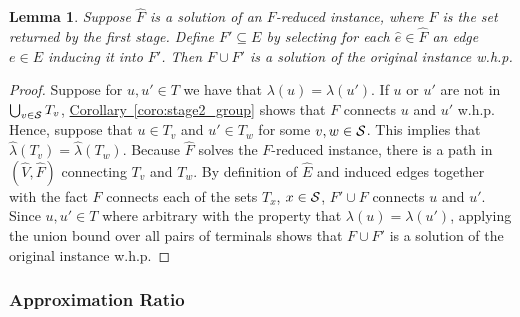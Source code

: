 \documentclass[letterpaper,11pt]{article}
\newtheorem{lemma}[theorem]{Lemma}
\newcommand{\namedref}[2]{\hyperref[#2]{#1~\ref*{#2}}}
\newcommand{\corollaryref}[1]{\namedref{Corollary}{#1}}
\newcommand{\Comp}{\lambda}
\begin{document}
\begin{lemma}\label{lemma:stage2_feasible}
Suppose $\hat{F}$ is a solution of an $F$-reduced instance, where $F$ is the set
returned by the first stage. Define $F'\subseteq E$ by selecting for each
$\hat{e}\in \hat{F}$ an edge $e\in E$ inducing it into $F'$. Then $F\cup F'$ is
a solution of the original instance w.h.p.
\end{lemma}
\begin{proof}
Suppose for $u,u'\in T$ we have that $\Comp(u)=\Comp(u')$. If $u$ or $u'$ are
not in $\bigcup_{v\in {\cal S}}T_v$, \corollaryref{coro:stage2_group} shows that
$F$ connects $u$ and $u'$ w.h.p. Hence, suppose that $u\in T_v$ and $u'\in
T_w$ for some $v,w\in {\cal S}$. This implies that
$\hat{\Comp}(T_v)=\hat{\Comp}(T_w)$. Because $\hat{F}$ solves the $F$-reduced
instance, there is a path in $(\hat{V},\hat{F})$ connecting $T_v$ and
$T_w$. By definition of $\hat{E}$ and induced edges together with the fact $F$
connects each of the sets $T_x$, $x\in {\cal S}$, $F'\cup F$ connects $u$ and
$u'$. Since $u,u'\in T$ where arbitrary with the property that
$\Comp(u)=\Comp(u')$, applying the union bound over all pairs of terminals
shows that $F\cup F'$ is a solution of the original instance w.h.p.
\end{proof}

\subsubsection*{Approximation Ratio}
\end{document}

